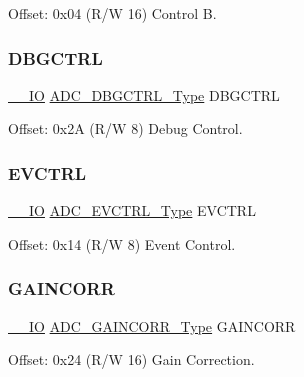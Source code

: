 Offset\+: 0x04 (R/W 16) Control B. 

\mbox{\label{struct_adc_aac818028dcd5dc0e679047a9986dbfb0}} 
\subsubsection{\texorpdfstring{DBGCTRL}{DBGCTRL}}
{\footnotesize\ttfamily \mbox{\hyperlink{core__cm0plus_8h_aec43007d9998a0a0e01faede4133d6be}{\+\_\+\+\_\+\+IO}} \mbox{\hyperlink{union_a_d_c___d_b_g_c_t_r_l___type}{A\+D\+C\+\_\+\+D\+B\+G\+C\+T\+R\+L\+\_\+\+Type}} D\+B\+G\+C\+T\+RL}



Offset\+: 0x2A (R/W 8) Debug Control. 

\mbox{\label{struct_adc_abe8bcddd50786fcd2670fd8e60ca2f85}} 
\subsubsection{\texorpdfstring{EVCTRL}{EVCTRL}}
{\footnotesize\ttfamily \mbox{\hyperlink{core__cm0plus_8h_aec43007d9998a0a0e01faede4133d6be}{\+\_\+\+\_\+\+IO}} \mbox{\hyperlink{union_a_d_c___e_v_c_t_r_l___type}{A\+D\+C\+\_\+\+E\+V\+C\+T\+R\+L\+\_\+\+Type}} E\+V\+C\+T\+RL}



Offset\+: 0x14 (R/W 8) Event Control. 

\mbox{\label{struct_adc_ad4d4aa9db75c451e2b6ecf78eac5b463}} 
\subsubsection{\texorpdfstring{GAINCORR}{GAINCORR}}
{\footnotesize\ttfamily \mbox{\hyperlink{core__cm0plus_8h_aec43007d9998a0a0e01faede4133d6be}{\+\_\+\+\_\+\+IO}} \mbox{\hyperlink{union_a_d_c___g_a_i_n_c_o_r_r___type}{A\+D\+C\+\_\+\+G\+A\+I\+N\+C\+O\+R\+R\+\_\+\+Type}} G\+A\+I\+N\+C\+O\+RR}



Offset\+: 0x24 (R/W 16) Gain Correction. 

\mbox{\label{struct_adc_aca7d1b7b8c0fcf60fb5b8210a1f8801e}} 
